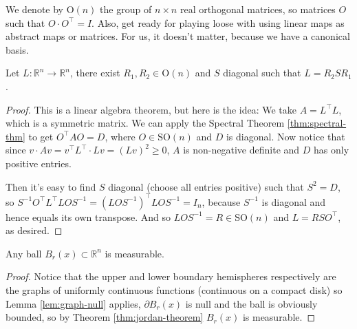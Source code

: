 \begin{remark}[$\text{O}(n)$]
	We denote by $\text{O}(n)$ the group of $n \times n$ real orthogonal matrices, so matrices $O$ such that $O \cdot O^\top = I$. Also, get ready for playing loose with using linear maps as abstract maps or matrices. For us, it doesn't matter, because we have a canonical basis.
\end{remark}

\begin{lemma}[Decomposition]\label{lem:polar-decomp}
	Let $L : \mathbb{R}^{n} \to  \mathbb{R}^{n}$, there exist $R_{1}, R_{2} \in \text{O}(n)$ and $S$ diagonal such that $L = R_{2}SR_{1}$.
\end{lemma}
\begin{proof}
	This is a linear algebra theorem, but here is the idea: We take $A = L^\top L$, which is a symmetric matrix. We can apply the Spectral Theorem \ref{thm:spectral-thm} to get $O^\top A O = D$, where $O \in \text{SO}(n)$ and $D$ is diagonal. Now notice that since $v \cdot Av = v^\top L^\top \cdot L v = (Lv)^{2} \geq 0$, $A$ is non-negative definite and $D$ has only positive entries.

	Then it's easy to find $S$ diagonal (choose all entries positive) such that $S^{2} = D$, so $S^{-1} O^\top  L^\top L O S^{-1} = (L OS^{-1})^\top LOS^{-1}= I_{n}$, because $S^{-1}$ is diagonal and hence equals its own transpose. And so $L O S^{-1} = R \in \text{SO}(n)$ and $L = R S O^\top$, as desired.
\end{proof}

\begin{lemma}\label{lem:balls-measurable}
	Any ball $B_{r}(x) \subset \mathbb{R}^{n}$ is measurable.
\end{lemma}
\begin{proof}
	Notice that the upper and lower boundary hemispheres respectively are the graphs of uniformly continuous functions (continuous on a compact disk) so Lemma \ref{lem:graph-null} applies, $\partial B_{r}(x)$ is null and the ball is obviously bounded, so by Theorem \ref{thm:jordan-theorem} $B_{r}(x)$ is measurable.
\end{proof}

